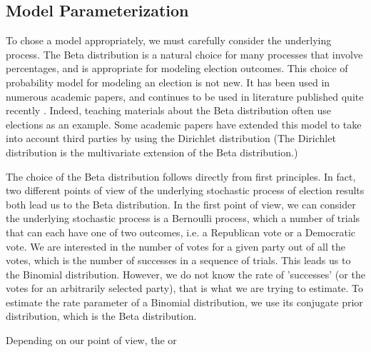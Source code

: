 \documentclass[preprint,12pt]{article}
\begin{document}
\subsection{Model Parameterization}
To chose a model appropriately, we must carefully consider the underlying process. 
The Beta distribution is a natural choice for many processes that involve percentages, and is appropriate for modeling election outcomes. 
This choice of probability model for modeling an election is not new. 
It has been used in numerous academic papers, and continues to be used in literature published quite recently \cite{Paolino_2001_,Kaplan_2003_10.1287/opre.51.1.32.12794,Murr_2015_10.1177/2053168015583346}.
Indeed, teaching materials about the Beta distribution often use elections as an example.  
Some academic papers have extended this model to take into account third parties by using the Dirichlet distribution \cite{Rigdon_2009_10.1177/1532673X08330670} (The Dirichlet distribution is the multivariate extension of the Beta distribution.) 

The choice of the Beta distribution follows directly from first principles. 
In fact, two different points of view of the underlying stochastic process of election results both lead us to the Beta distribution. 
In the first point of view, we can consider the underlying stochastic process is a Bernoulli process, which a number of trials that can each have one of two outcomes, i.e. a Republican vote or a Democratic vote.
We are interested in the number of votes for a given party out of all the votes, which is the number of successes in a sequence of trials.  
This leads us to the Binomial distribution. 
However, we do not know the rate of 'successes' (or the votes for an arbitrarily selected party), that is what we are trying to estimate.  
To estimate the rate parameter of a Binomial distribution, we use its conjugate prior distribution, which is the Beta distribution.

Depending on our point of view, the or   
\end{document}
